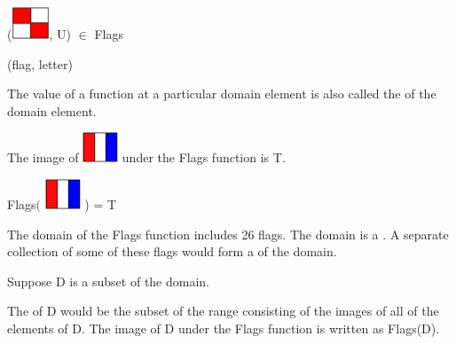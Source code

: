 \documentclass{ximera}
\begin{document}
\begin{exercise}
 ({\includegraphics[width=42px,height=36px]{pics/flags/U.png}}, U) $\in$ Flags 

  \begin{multipleChoice}
  \end{multipleChoice}
  \begin{feedback}
(flag, letter)
  \end{feedback}
\end{exercise}





\begin{definition}
The value of a function at a particular domain element is also called the  of the domain element.
  
\end{definition}

\begin{example}

The image of {\includegraphics[width=40px,height=34px]{pics/flags/T.png}} under the Flags function is T.

Flags$\bigg($ {\includegraphics[width=40px,height=34px]{pics/flags/T.png}} ) = T

\end{example}




\begin{definition}
  The domain of the Flags function includes 26 flags.  The domain is a .  A separate collection of some of these flags would form a  of the domain.
  
  Suppose D is a subset of the domain.
  
  The  of D would be the subset of the range consisting of the images of all of the elements of D. The image of D under the Flags function is written as Flags(D).
 
  
\end{definition}
\end{document}
